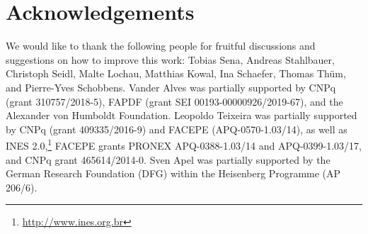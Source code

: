 \documentclass[acmsmall,colorlinks, dvipsnames]{acmart}
\begin{document}


\maketitle
    

%    







%




\section*{Acknowledgements}

We would like to thank the following people for fruitful discussions and suggestions on how to improve this work: Tobias Sena, Andreas Stahlbauer, Christoph Seidl, Malte Lochau, Matthias Kowal, Ina Schaefer, Thomas Th{\"u}m, and Pierre-Yves Schobbens. 
Vander Alves was partially supported by CNPq (grant 310757/2018-5), FAPDF (grant SEI 00193-00000926/2019-67), and the Alexander von Humboldt Foundation.
Leopoldo Teixeira was partially supported by CNPq (grant 409335/2016-9) and FACEPE (APQ-0570-1.03/14), as well as INES 2.0,\footnote{\url{http://www.ines.org.br}} FACEPE grants PRONEX APQ-0388-1.03/14 and APQ-0399-1.03/17, and CNPq grant 465614/2014-0.
Sven Apel was partially supported by the German Research Foundation (DFG) within the Heisenberg Programme (AP 206/6).

%


%
%
%
%
\end{document}
